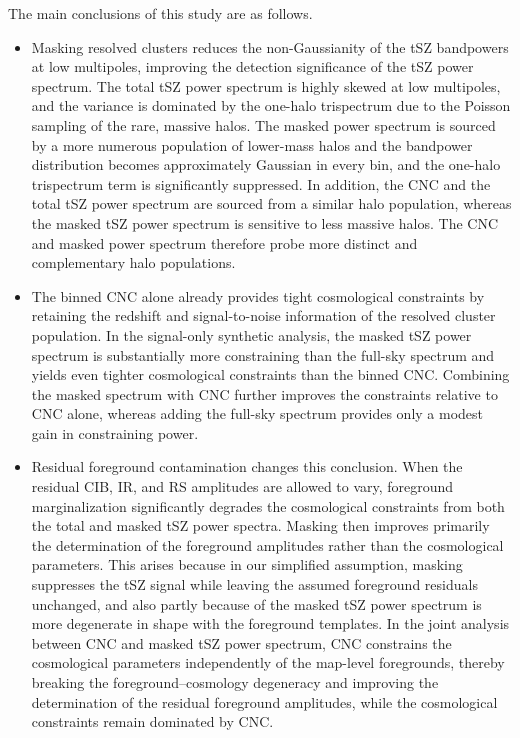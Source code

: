 \documentclass[aps,prd,twocolumn,superscriptaddress,nofootinbib,floatfix]{revtex4-2}
\begin{document}
The main conclusions of this study are as follows.
\begin{itemize}
    \item Masking resolved clusters reduces the non-Gaussianity of the tSZ bandpowers at low multipoles, improving the detection significance of the tSZ power spectrum. The total tSZ power spectrum is highly skewed at low multipoles, and the variance is dominated by the one-halo trispectrum due to the Poisson sampling of the rare, massive halos. The masked power spectrum is sourced by a more numerous population of lower-mass halos and the bandpower
    distribution becomes approximately Gaussian in every bin, and the one-halo trispectrum term is significantly suppressed. In addition, the CNC and the total tSZ power spectrum are sourced from a similar halo population, whereas the masked tSZ power spectrum is sensitive to less massive halos. The CNC and masked power spectrum therefore probe more distinct and complementary halo populations.

    \item The binned CNC alone already provides tight cosmological constraints by retaining the redshift and signal-to-noise information of the resolved cluster population. In the signal-only synthetic analysis, the masked tSZ power spectrum is substantially more constraining than the full-sky spectrum and yields even tighter cosmological constraints than the binned CNC. Combining the masked spectrum with CNC further improves the constraints relative to CNC alone, whereas adding the full-sky spectrum provides only a modest gain in constraining power.

    \item Residual foreground contamination changes this conclusion. When the residual CIB, IR, and RS amplitudes are allowed to vary, foreground marginalization significantly degrades the cosmological constraints from both the total and masked tSZ power spectra. Masking then improves primarily the determination of the foreground amplitudes rather than the cosmological parameters. This arises because in our simplified assumption, masking suppresses the tSZ signal while leaving the assumed foreground residuals unchanged, and also partly because of the masked tSZ power spectrum is more degenerate in shape with the foreground templates. In the joint analysis between CNC and masked tSZ power spectrum, CNC constrains the cosmological parameters independently of the map-level foregrounds, thereby breaking the foreground--cosmology degeneracy and improving the determination of the residual foreground amplitudes, while the cosmological constraints remain dominated by CNC.
    

\end{itemize}
\end{document}
